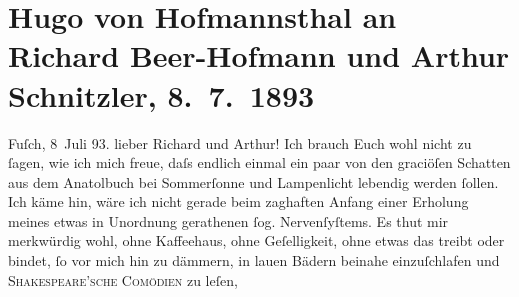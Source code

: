 

         
         \renewcommand{\erwaehntePersonen}{Personen: Richard Beer-Hofmann, Johann Wolfgang von Goethe, Friedrich Maximilian von Klinger, Friedrich von Schiller, William Shakespeare}
         \renewcommand{\erwaehnteInstitutionen}{Institutionen: Manz’sche Verlags- und Universitätsbuchhandlung}
         \renewcommand{\erwaehnteOrte}{Orte: Bad Fusch, Bad Ischl, Karlsbad, Kohlmarkt}
         \renewcommand{\erwaehnteWerke}{Werke: Anatol, Briefwechsel zwischen Schiller und Goethe, Gestern. Dramatische Studie in einem Akt in Versen}
               \section[Hugo von Hofmannsthal an Richard Beer-Hofmann und Arthur Schnitzler, 8. 7. 1893]{ Hugo von Hofmannsthal an Richard Beer-Hofmann und Arthur Schnitzler,
               8. 7. 1893}\nopagebreak{}\rehead{ }\begin{ledgroupsized}[t]{13cm}\normalsize\beginnumbering \toendnotes[C]{\smallbreak\pagebreak[2]} 
\pstart
           \raggedleft{}{\pb}Fuſch, 8 Juli 93.\pend
           \pstart{}lieber Richard und Arthur!\pend\pstart
           Ich brauch Euch wohl nicht zu ſagen, wie ich mich freue, daſs endlich einmal ein paar
               von den graciöſen Schatten aus dem Anatolbuch bei
               Sommerſonne und Lampenlicht lebendig werden ſollen. Ich käme hin, wäre ich nicht
               gerade beim zaghaften Anfang einer Erholung meines etwas in Unordnung gerathenen ſog.
               Nervenſyſtems.\pend
           \pstart
           Es thut mir merkwürdig wohl, ohne Kaffeehaus, ohne Geſelligkeit, ohne etwas das
               treibt oder bindet, ſo vor mich hin zu dämmern, {\pb}in
               lauen Bädern beinahe einzuſchlafen und \textsc{Shakespeare’sche Comödien} zu leſen,

\end{ledgroupsized}
